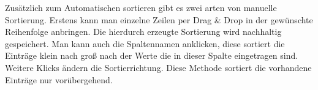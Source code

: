 \noindent
Zusätzlich zum Automatischen sortieren gibt es zwei arten von manuelle Sortierung. Erstens kann man einzelne Zeilen per Drag \& Drop in der gewünschte Reihenfolge anbringen. Die hierdurch erzeugte Sortierung wird nachhaltig gespeichert. Man kann auch die Spaltennamen anklicken, diese sortiert die Einträge klein nach groß nach der Werte die in dieser Spalte eingetragen sind. Weitere Klicks ändern die Sortierrichtung. Diese Methode sortiert die vorhandene Einträge nur vorübergehend.